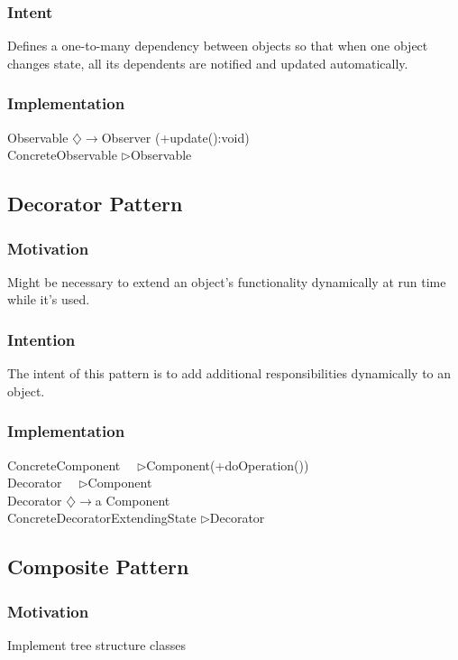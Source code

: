 \documentclass[a4paper]{scrartcl}
\newcommand{\aggregates}{$\diamondsuit\rightarrow $}
\newcommand{\implements}{\textendash ~\textendash ~\textendash$\triangleright$}
\newcommand{\extends}{\textendash\textendash\textendash$\triangleright$}
\begin{document}
      \subsubsection{Intent}
        Defines a one-to-many dependency between objects so that when one object changes state, all its dependents are notified and updated automatically.
      \subsubsection{Implementation}
        Observable \aggregates Observer (+update():void)\\
        ConcreteObservable \extends Observable\\
        
        
    \subsection { Decorator Pattern }
      \subsubsection {Motivation}
        Might be necessary to extend an object's functionality dynamically at run time while it's used.
      \subsubsection {Intention }
        The intent of this pattern is to add additional responsibilities dynamically to an object.
      \subsubsection{Implementation}
        ConcreteComponent \implements Component(+doOperation())\\
        Decorator \implements Component\\
        Decorator \aggregates a Component\\
        ConcreteDecoratorExtendingState \extends Decorator\\
        
        
    \subsection { Composite Pattern}
      \subsubsection {Motivation}
        Implement tree structure classes
\end{document}
